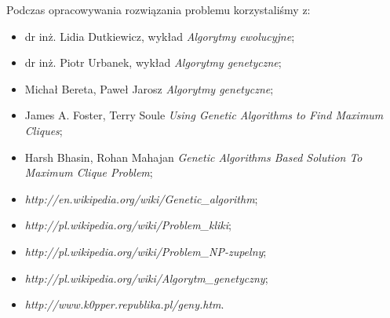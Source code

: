 \documentclass[11pt]{aghdpl}
\begin{document}
Podczas opracowywania rozwiązania problemu korzystaliśmy z:
\begin{itemize}[noitemsep]
 \item dr inż. Lidia Dutkiewicz, wykład \textit{Algorytmy ewolucyjne};
  \item dr inż. Piotr Urbanek, wykład \textit{Algorytmy genetyczne};
 \item Michał Bereta, Paweł Jarosz \textit{Algorytmy genetyczne};
 \item James A. Foster, Terry Soule \textit{Using Genetic Algorithms to Find Maximum Cliques};
 \item Harsh Bhasin, Rohan Mahajan \textit{Genetic Algorithms Based Solution To
Maximum Clique Problem};
\item \textit{http://en.wikipedia.org/wiki/Genetic\_algorithm};
 \item \textit{http://pl.wikipedia.org/wiki/Problem\_kliki}; %
 \item \textit{http://pl.wikipedia.org/wiki/Problem\_NP-zupelny};
 \item \textit{http://pl.wikipedia.org/wiki/Algorytm\_genetyczny};
 \item \textit{http://www.k0pper.republika.pl/geny.htm}.
\end{itemize}



%
%



% 
% 

%
%
%
%
%
%
\end{document}
